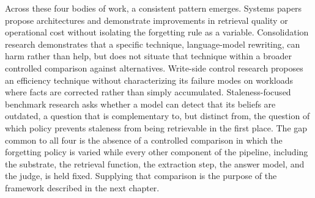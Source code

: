 Across these four bodies of work, a consistent pattern emerges. Systems papers propose architectures and demonstrate improvements in retrieval quality or operational cost without isolating the forgetting rule as a variable. Consolidation research demonstrates that a specific technique, language-model rewriting, can harm rather than help, but does not situate that technique within a broader controlled comparison against alternatives. Write-side control research proposes an efficiency technique without characterizing its failure modes on workloads where facts are corrected rather than simply accumulated. Staleness-focused benchmark research asks whether a model can detect that its beliefs are outdated, a question that is complementary to, but distinct from, the question of which policy prevents staleness from being retrievable in the first place. The gap common to all four is the absence of a controlled comparison in which the forgetting policy is varied while every other component of the pipeline, including the substrate, the retrieval function, the extraction step, the answer model, and the judge, is held fixed. Supplying that comparison is the purpose of the framework described in the next chapter.
